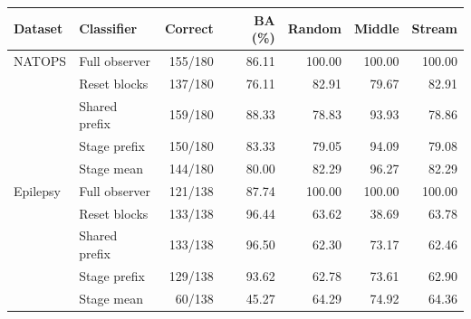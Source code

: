 \begin{tabular}{llrrrrr}\toprule
Dataset & Classifier & Correct & BA (\%) & Random & Middle & Stream \\\midrule
NATOPS & Full observer & 155/180 & 86.11 & 100.00 & 100.00 & 100.00 \\
 & Reset blocks & 137/180 & 76.11 & 82.91 & 79.67 & 82.91 \\
 & Shared prefix & 159/180 & 88.33 & 78.83 & 93.93 & 78.86 \\
 & Stage prefix & 150/180 & 83.33 & 79.05 & 94.09 & 79.08 \\
 & Stage mean & 144/180 & 80.00 & 82.29 & 96.27 & 82.29 \\
\midrule
Epilepsy & Full observer & 121/138 & 87.74 & 100.00 & 100.00 & 100.00 \\
 & Reset blocks & 133/138 & 96.44 & 63.62 & 38.69 & 63.78 \\
 & Shared prefix & 133/138 & 96.50 & 62.30 & 73.17 & 62.46 \\
 & Stage prefix & 129/138 & 93.62 & 62.78 & 73.61 & 62.90 \\
 & Stage mean & 60/138 & 45.27 & 64.29 & 74.92 & 64.36 \\
\bottomrule\end{tabular}
